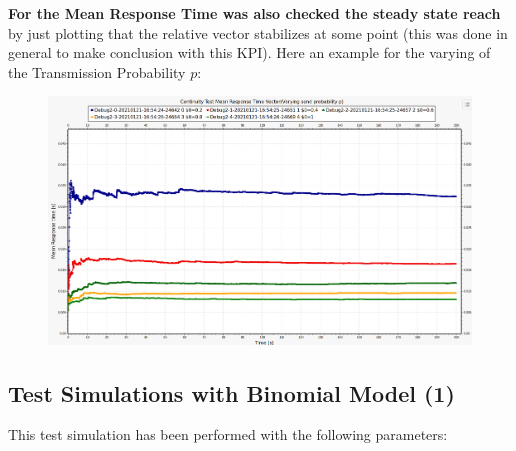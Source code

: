 \textbf{For the Mean Response Time was also checked the steady state reach} by just plotting that the relative vector stabilizes at some point (this was done in general to make conclusion with this KPI). Here an example for the varying of the Transmission Probability $p$:
\begin{figure}[H]
	\centering
	\includegraphics[width=\textwidth]{img/ContinuityTest_ResponseTime_VectorP.png}
	\label {img: responseTimeConvergence}
\end{figure}
\subsection{Test Simulations with Binomial Model (1)}
This test simulation has been performed with the following parameters:
